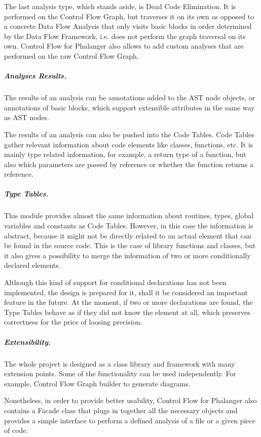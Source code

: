     The last analysis type, which stands aside, is Dead Code 
    Elimination. It is performed on the Control Flow Graph, 
    but traverses it on its own as opposed to a concrete 
    Data Flow Analysis that only visits basic blocks 
    in order determined by the Data Flow Framework, 
    i.e. does not perform the graph traversal 
    on its own. Control Flow for Phalanger also allows 
    to add custom analyses that are performed on the raw 
    Control Flow Graph.
    
    \subparagraph*{Analyses Results.}
    The results of an analysis can be annotations added 
    to the AST node objects, or annotations of basic blocks, 
    which support extensible attributes in the same way as 
    AST nodes.
    
    The results of an analysis can also be pushed into 
    the Code Tables. Code Tables gather relevant information 
    about code elements like classes, functions, etc. 
    It is mainly type related information, 
    for example, a return type of a function, 
    but also which parameters are passed by reference or 
    whether the function returns a reference.
    
    \subparagraph*{Type Tables.} This module provides 
    almost the same information about routines, types, 
    global variables and constants as Code Tables. 
    However, in this case the information 
    is abstract, because it might not be directly related 
    to an actual element that can be found in the source code. 
    This is the case of library functions and classes, 
    but it also gives a possibility to merge the information 
    of two or more conditionally declared elements. 
    
    Although this kind of support for conditional declarations 
    has not been implemented, the design is prepared for it, 
    shall it be considered an important feature in the future. 
    At the moment, if two or more declarations are found, 
    the Type Tables behave as if they did not know the 
    element at all, which preserves correctness for the 
    price of loosing precision.
    
    \subparagraph*{Extensibility.}
    The whole project is designed as a class library and 
    framework with many extension points. Some of the 
    functionality can be used independently. For example, 
    Control Flow Graph builder to generate diagrams.
    
    Nonetheless, in order to provide better usability, 
    Control Flow for Phalanger also contains 
    a Facade class  
    that plugs in together all the necessary objects 
    and provides a simple interface to perform a defined 
    analysis of a file or a given piece of code.
    
